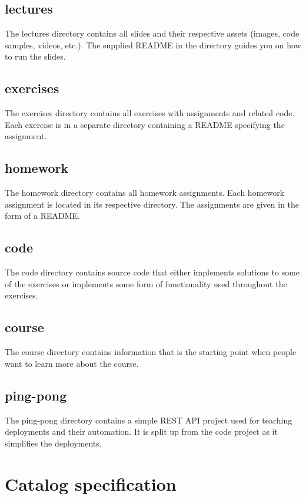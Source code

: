 \documentclass[
  digital,
  color,
  oneside,
  nosansbold,
  nocolorbold,
  nolof,
  nolot,
]{fithesis4}
\begin{document}
\section{lectures}

The lectures directory contains all slides and their respective assets (images, code samples, videos, etc.). The supplied README in the directory guides you on how to run the slides.

\section{exercises}

The exercises directory contains all exercises with assignments and related code. Each exercise is in a separate directory containing a README specifying the assignment.

\section{homework}

The homework directory contains all homework assignments. Each homework assignment is located in its respective directory. The assignments are given in the form of a README.

\section{code}

The code directory contains source code that either implements solutions to some of the exercises or implements some form of functionality used throughout the exercises.
\section{course}

The course directory contains information that is the starting point when people want to learn more about the course.
\section{ping-pong}

The ping-pong directory contains a simple REST API project used for teaching deployments and their automation. It is split up from the code project as it simplifies the deployments.

\chapter{Catalog specification}
\end{document}
